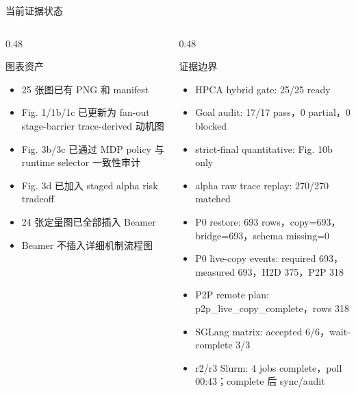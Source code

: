 \documentclass[aspectratio=43]{beamer}
\newcommand{\tightitems}{\setlength{\itemsep}{2pt}\setlength{\parskip}{0pt}}
\begin{document}
\begin{frame}{当前证据状态}
  \footnotesize
  \begin{columns}[T,onlytextwidth]
    \begin{column}{0.48\textwidth}
      \begin{block}{图表资产}
        \begin{itemize}
          \tightitems
          \item 25 张图已有 PNG 和 manifest
          \item Fig. 1/1b/1c 已更新为 fan-out stage-barrier trace-derived 动机图
          \item Fig. 3b/3c 已通过 MDP policy 与 runtime selector 一致性审计
          \item Fig. 3d 已加入 staged alpha risk tradeoff
          \item 24 张定量图已全部插入 Beamer
          \item Beamer 不插入详细机制流程图
        \end{itemize}
      \end{block}
    \end{column}
    \begin{column}{0.48\textwidth}
      \begin{block}{证据边界}
        \begin{itemize}
          \tightitems
          \item HPCA hybrid gate: 25/25 ready
          \item Goal audit: 17/17 pass，0 partial，0 blocked
          \item strict-final quantitative: Fig. 10b only
          \item alpha raw trace replay: 270/270 matched
          \item P0 restore: 693 rows，copy=693，bridge=693，schema missing=0
          \item P0 live-copy events: required 693，measured 693，H2D 375，P2P 318
          \item P2P remote plan: p2p\_live\_copy\_complete，rows 318
          \item SGLang matrix: accepted 6/6，wait-complete 3/3
          \item r2/r3 Slurm: 4 jobs complete，poll 00:43；complete 后 sync/audit
        \end{itemize}
      \end{block}
    \end{column}
  \end{columns}
\end{frame}
\end{document}

